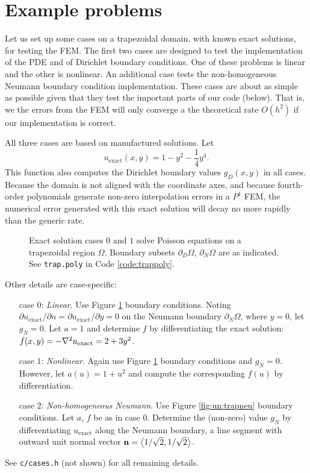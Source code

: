 \section{Example problems}

Let us set up some cases on a trapezoidal domain, with known exact solutions, for testing the FEM.  The first two cases are designed to test the implementation of the PDE and of Dirichlet boundary conditions.  One of these problems is linear and the other is nonlinear.  An additional case tests the non-homogeneous Neumann boundary condition implementation.  These cases are about as simple as possible given that they test the important parts of our code (below).  That is, we the errors from the FEM will only converge a the theoretical rate $O(h^2)$ if our implementation is correct.

All three cases are based on manufactured solutions.  Let
\begin{equation}
  u_{\text{exact}}(x,y) = 1 - y^2 - \frac{1}{4} y^4. \label{eq:un:exactsolution}
\end{equation}
This function also computes the Dirichlet boundary values $g_D(x,y)$ in all cases.  Because the domain is not aligned with the coordinate axes, and because fourth-order polynomials generate non-zero interpolation errors in a $P^1$ FEM, the numerical error generated with this exact solution will decay no more rapidly than the generic rate.

\begin{figure}

\caption{Exact solution cases $0$ and $1$ solve Poisson equations on a trapezoidal region $\Omega$.  Boundary subsets $\partial_D\Omega$, $\partial_N \Omega$ are as indicated.  See \texttt{trap.poly} in Code \ref{code:trappoly}.}
\label{fig:un:trap}
\end{figure}

Other details are case-specific:
\begin{itemize}
\item[case $0$:] \emph{Linear}.  Use Figure \ref{fig:un:trap} boundary conditions.  Noting $\partial u_{\text{exact}}/\partial n = \partial u_{\text{exact}}/\partial y = 0$ on the Neumann boundary $\partial_N \Omega$, where $y=0$, let $g_N=0$.  Let $a=1$ and determine $f$ by differentiating the exact solution: $f(x,y) = -\nabla^2 u_{\text{exact}} = 2 + 3 y^2$.
\item[case $1$:] \emph{Nonlinear}.  Again use Figure \ref{fig:un:trap} boundary conditions and $g_N=0$.  However, let $a(u) = 1+u^2$ and compute the corresponding $f(u)$ by differentiation.
\item[case $2$:] \emph{Non-homogeneous Neumann}.  Use Figure \ref{fig:un:trapneu} boundary conditions.  Let $a$, $f$ be as in case $0$.  Determine the (non-zero) value $g_N$ by differentiating $u_{\text{exact}}$ along the Neumann boundary, a line segment with outward unit normal vector $\mathbf{n} = \left<1/\sqrt{2},1/\sqrt{2}\right>$.
\end{itemize}
See \texttt{c/\CODELOC cases.h} (not shown) for all remaining details.

